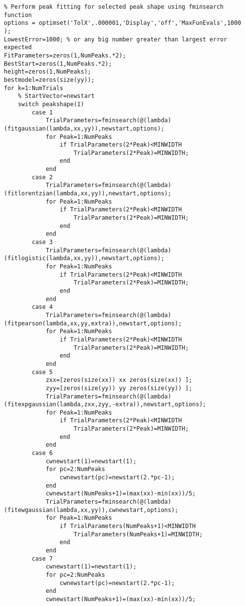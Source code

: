 \begin{lstlisting}
% Perform peak fitting for selected peak shape using fminsearch function
options = optimset('TolX',.000001,'Display','off','MaxFunEvals',1000 );
LowestError=1000; % or any big number greater than largest error expected
FitParameters=zeros(1,NumPeaks.*2); 
BestStart=zeros(1,NumPeaks.*2); 
height=zeros(1,NumPeaks); 
bestmodel=zeros(size(yy));
for k=1:NumTrials
    % StartVector=newstart
    switch peakshape(1)
        case 1
            TrialParameters=fminsearch(@(lambda)(fitgaussian(lambda,xx,yy)),newstart,options);
            for Peak=1:NumPeaks
                if TrialParameters(2*Peak)<MINWIDTH
                    TrialParameters(2*Peak)=MINWIDTH;
                end
            end
        case 2
            TrialParameters=fminsearch(@(lambda)(fitlorentzian(lambda,xx,yy)),newstart,options);
            for Peak=1:NumPeaks
                if TrialParameters(2*Peak)<MINWIDTH
                    TrialParameters(2*Peak)=MINWIDTH;
                end
            end
        case 3
            TrialParameters=fminsearch(@(lambda)(fitlogistic(lambda,xx,yy)),newstart,options);
            for Peak=1:NumPeaks
                if TrialParameters(2*Peak)<MINWIDTH
                    TrialParameters(2*Peak)=MINWIDTH;
                end
            end
        case 4
            TrialParameters=fminsearch(@(lambda)(fitpearson(lambda,xx,yy,extra)),newstart,options);
            for Peak=1:NumPeaks
                if TrialParameters(2*Peak)<MINWIDTH
                    TrialParameters(2*Peak)=MINWIDTH;
                end
            end
        case 5
            zxx=[zeros(size(xx)) xx zeros(size(xx)) ];
            zyy=[zeros(size(yy)) yy zeros(size(yy)) ];
            TrialParameters=fminsearch(@(lambda)(fitexpgaussian(lambda,zxx,zyy,-extra)),newstart,options);
            for Peak=1:NumPeaks
                if TrialParameters(2*Peak)<MINWIDTH
                    TrialParameters(2*Peak)=MINWIDTH;
                end
            end
        case 6
            cwnewstart(1)=newstart(1);
            for pc=2:NumPeaks
                cwnewstart(pc)=newstart(2.*pc-1);
            end
            cwnewstart(NumPeaks+1)=(max(xx)-min(xx))/5;
            TrialParameters=fminsearch(@(lambda)(fitewgaussian(lambda,xx,yy)),cwnewstart,options);
            for Peak=1:NumPeaks
                if TrialParameters(NumPeaks+1)<MINWIDTH
                    TrialParameters(NumPeaks+1)=MINWIDTH;
                end
            end
        case 7
            cwnewstart(1)=newstart(1);
            for pc=2:NumPeaks
                cwnewstart(pc)=newstart(2.*pc-1);
            end
            cwnewstart(NumPeaks+1)=(max(xx)-min(xx))/5;

\end{lstlisting}
